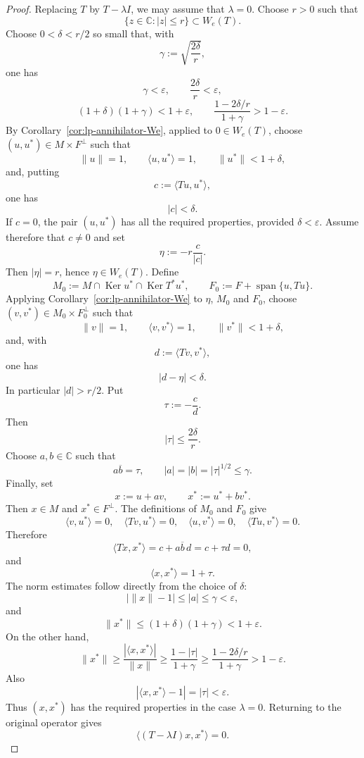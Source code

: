\documentclass[11pt]{amsart}
\numberwithin{equation}{section}
\theoremstyle{definition}
\theoremstyle{remark}
\DeclareMathOperator{\Ker}{Ker}
\newcommand{\C}{\mathbb{C}}
\newcommand{\ip}[2]{\langle #1,#2\rangle}
\newcommand{\We}{W_e}
\begin{document}
\begin{proof}
Replacing $T$ by $T-\lambda I$, we may assume that $\lambda=0$.  Choose
$r>0$ such that
\[
        \{z\in\C: |z|\le r\}\subset \We(T).
\]
Choose $0<\delta<r/2$ so small that, with
\[
        \gamma:=\sqrt{\frac{2\delta}{r}},
\]
one has
\[
        \gamma<\varepsilon,
        \qquad
        \frac{2\delta}{r}<\varepsilon,
\]
\[
        (1+\delta)(1+\gamma)<1+\varepsilon,
        \qquad
        \frac{1-2\delta/r}{1+\gamma}>1-\varepsilon .
\]
By Corollary~\ref{cor:lp-annihilator-We}, applied to $0\in\We(T)$, choose
$(u,u^*)\in M\times F^\perp$ such that
\[
        \|u\|=1,
        \qquad
        \ip{u}{u^*}=1,
        \qquad
        \|u^*\|<1+\delta,
\]
and, putting
\[
        c:=\ip{Tu}{u^*},
\]
one has
\[
        |c|<\delta .
\]
If $c=0$, the pair $(u,u^*)$ has all the required properties, provided
$\delta<\varepsilon$.  Assume therefore that $c\ne0$ and set
\[
        \eta:=-r\frac{c}{|c|} .
\]
Then $|\eta|=r$, hence $\eta\in\We(T)$.  Define
\[
        M_0:=M\cap\Ker u^*\cap\Ker T^*u^*,
        \qquad
        F_0:=F+\operatorname{span}\{u,Tu\}.
\]
Applying Corollary~\ref{cor:lp-annihilator-We} to $\eta$, $M_0$ and $F_0$, choose
$(v,v^*)\in M_0\times F_0^\perp$ such that
\[
        \|v\|=1,
        \qquad
        \ip{v}{v^*}=1,
        \qquad
        \|v^*\|<1+\delta,
\]
and, with
\[
        d:=\ip{Tv}{v^*},
\]
one has
\[
        |d-\eta|<\delta .
\]
In particular $|d|>r/2$.  Put
\[
        \tau:=-\frac{c}{d} .
\]
Then
\[
        |\tau|\le \frac{2\delta}{r}.
\]
Choose \(a,b\in\mathbb C\) such that
\[
        a\overline b=\tau,
        \qquad
        |a|=|b|=|\tau|^{1/2}\le\gamma.
\]
Finally, set
\[
        x:=u+av,
        \qquad
        x^*:=u^*+bv^* .
\]
Then $x\in M$ and $x^*\in F^\perp$.  The definitions of $M_0$ and $F_0$ give
\[
        \ip{v}{u^*}=0,
        \quad
        \ip{Tv}{u^*}=0,
        \quad
        \ip{u}{v^*}=0,
        \quad
        \ip{Tu}{v^*}=0 .
\]
Therefore
\[
        \ip{Tx}{x^*}=c+a\overline b\,d=c+\tau d=0,
\]
and
\[
        \ip{x}{x^*}=1+\tau .
\]
The norm estimates follow directly from the choice of $\delta$:
\[
        |\|x\|-1|\le |a|\le\gamma<\varepsilon,
\]
and
\[
        \|x^*\|\le (1+\delta)(1+\gamma)<1+\varepsilon .
\]
On the other hand,
\[
        \|x^*\|\ge \frac{|\ip{x}{x^*}|}{\|x\|}
        \ge \frac{1-|\tau|}{1+\gamma}
        \ge \frac{1-2\delta/r}{1+\gamma}>1-\varepsilon .
\]
Also
\[
        |\ip{x}{x^*}-1|=|\tau|<\varepsilon .
\]
Thus $(x,x^*)$ has the required properties in the case $\lambda=0$.
Returning to the original operator gives
\[
        \ip{(T-\lambda I)x}{x^*}=0 .
\]
\end{proof}
\end{document}
